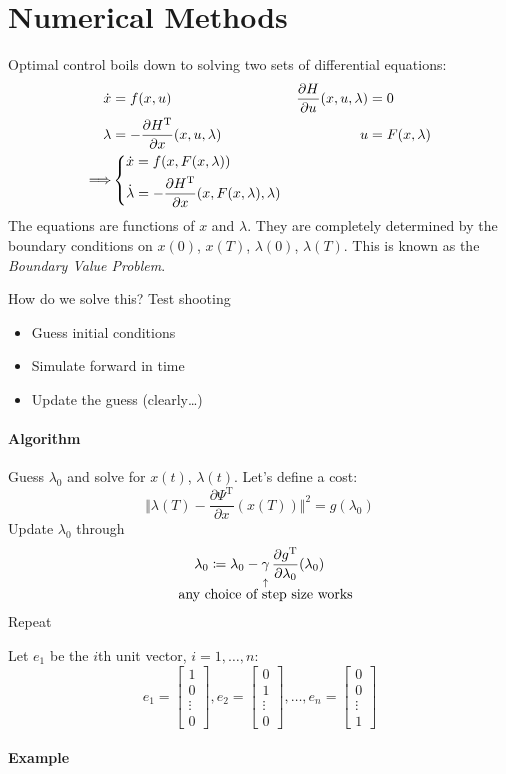 \documentclass[letterpaper,12pt,titlepage]{report}
\newcommand{\trans}{^\text{T}}
\newcommand*\pder[2]{\frac{\partial #1}{\partial #2}}
\theoremstyle{plain}
\theoremstyle{definition}
\begin{document}
\section{Numerical Methods}
Optimal control boils down to solving two sets of differential equations:
\begin{align}
  \dot x &= f(x,u) & \pder{H}{u}(x,u,\lambda) &= 0 \\
  \lambda &= -\pder{H\trans}{x}(x,u,\lambda) & u &= F(x,\lambda) \\
  \Longrightarrow & \begin{dcases}
    \dot x = f(x,F(x,\lambda)) \\
    \dot \lambda = -\pder{H\trans}{x}(x,F(x,\lambda),\lambda)
  \end{dcases}
\end{align}
The equations are functions of $x$ and $\lambda$. They are completely determined by the boundary conditions on $x(0)$, $x(T)$, $\lambda(0)$, $\lambda(T)$. This is known as the \emph{Boundary Value Problem}.

How do we solve this? Test shooting
\begin{itemize}
\item Guess initial conditions
\item Simulate forward in time
\item Update the guess (clearly\dots)
\end{itemize}


\paragraph{Algorithm}
Guess $\lambda_0$ and solve for $x(t)$, $\lambda(t)$.
Let's define a cost:
\[ \Vert \lambda(T) - \pder{\Psi\trans}{x}(x(T)) \Vert^2 = g(\lambda_0) \]
Update $\lambda_0$ through
\[ \lambda_0 \coloneqq \lambda_0 - \underbracket[0pt]{\gamma}_{\mathclap{\substack{\uparrow\\ \text{\normalsize any choice of step size works}}}} \pder{g\trans}{\lambda_0}(\lambda_0) \]
Repeat


Let $e_1$ be the $i$th unit vector, $i=1,\dots,n$:
\[ e_1 = \begin{bmatrix}
    1 \\ 0 \\ \vdots \\ 0
  \end{bmatrix},
  e_2 = \begin{bmatrix}
    0 \\ 1 \\ \vdots \\ 0
  \end{bmatrix},
  \dots,
  e_n = \begin{bmatrix}
    0 \\ 0 \\ \vdots \\ 1
  \end{bmatrix} \]


\paragraph{Example}
\end{document}
